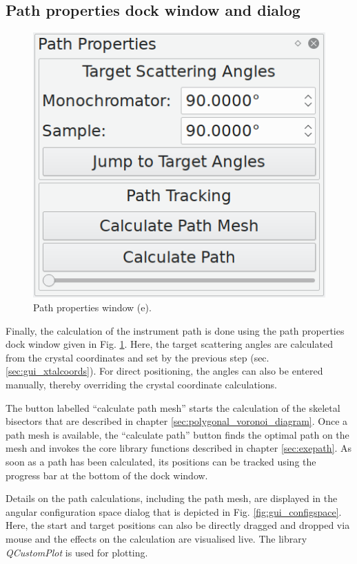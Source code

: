 \subsection{Path properties dock window and dialog}
\begin{minipage}{1 \textwidth}
\setlength{\intextsep}{0.25cm}
\begin{figure}
	\vspace{-0.25cm}
	\includegraphics[width = 0.25 \textwidth]{figures/gui_path}
	\caption[Path properties window]{Path properties window (e).
		\label{fig:gui_path}}
\end{figure}

Finally, the calculation of the instrument path is done using the path properties dock window
given in Fig. \ref{fig:gui_path}. Here, the target scattering angles are calculated from the crystal
coordinates and set by the previous step (sec. \ref{sec:gui_xtalcoords}). For direct positioning,
the angles can also be entered manually, thereby overriding the crystal coordinate calculations.

The button labelled ``calculate path mesh'' starts the calculation of the skeletal bisectors that are
described in chapter \ref{sec:polygonal_voronoi_diagram}.
Once a path mesh is available, the ``calculate path'' button finds the optimal path on the mesh and 
invokes the core library functions described in chapter \ref{sec:exepath}.
As soon as a path has been calculated, its positions can be tracked using the progress bar at the bottom
of the dock window.

Details on the path calculations, including the path mesh, are displayed in the angular configuration
space dialog that is depicted in Fig. \ref{fig:gui_configspace}.
Here, the start and target positions can also be directly dragged and dropped via mouse and the
effects on the calculation are visualised live.
The library \textit{QCustomPlot} \cite{web_QCustomPlot} is used for plotting.

\end{minipage}



